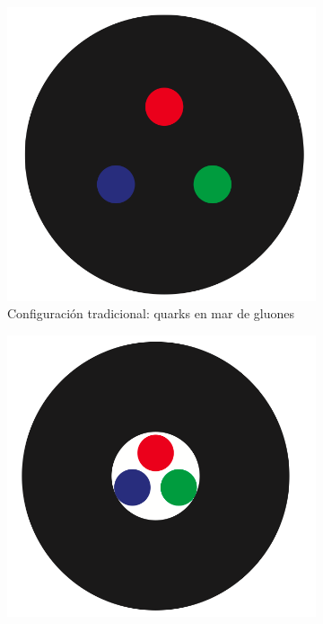 \begin{figure} %
    \centering
    \begin{subfigure}{0.2\textwidth} %
        \includegraphics[width=\linewidth]{./Images/Bag_model_sea_cropped.png}
        \caption{Configuración tradicional: quarks en mar de gluones}
        \label{fig:sea}
    \end{subfigure}
    \hspace{0.1cm} %
    \begin{subfigure}{0.21\textwidth}
        \includegraphics[width=\linewidth]{./Images/Bag_model_shell_cropped.png}

\end{subfigure}
\end{figure}

